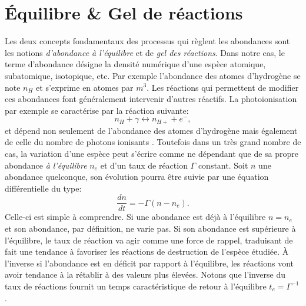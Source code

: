 \section{Équilibre \& Gel de réactions}
Les deux concepts fondamentaux des processus qui règlent les abondances sont les notions \textit{d'abondance à l'équilibre} et de \textit{gel des réactions}. Dans notre cas, le terme d'abondance désigne la densité numérique d'une espèce atomique, subatomique, isotopique, etc. Par exemple l'abondance des atomes d'hydrogène se note $n_H$ et s'exprime en atomes par $m^3$. Les réactions qui permettent de modifier ces abondances font généralement intervenir d'autres réactifs. La photoionisation par exemple se caractérise par la réaction suivante:
\begin{equation}
n_H+\gamma \leftrightarrow n_{H+} + e^-,
\end{equation}
et dépend non seulement de l'abondance des atomes d'hydrogène mais également de celle du nombre de photons ionisants . Toutefois dans un très grand nombre de cas, la variation d'une espèce peut s'écrire comme ne dépendant que de sa propre abondance \textit{à l'équilibre} $n_e$ et d'un taux de réaction $\Gamma$ constant. Soit $n$ une abondance quelconque, son évolution pourra être suivie par une équation différentielle du type:
\begin{equation}
\frac{dn}{dt}=-\Gamma (n-n_e).
\end{equation}
Celle-ci est simple à comprendre. Si une abondance est déjà à l'équilibre $n=n_e$ et son abondance, par définition, ne varie pas. Si son abondance est supérieure à l'équilibre, le taux de réaction va agir comme une force de rappel, traduisant de fait une tendance à favoriser les réactions de destruction de l'espèce étudiée. À l'inverse si l'abondance est en déficit par rapport à l'équilibre, les réactions vont avoir tendance à la rétablir à des valeurs plus élevées. Notons que  l'inverse du taux de réactions fournit un temps caractéristique de retour à l'équilibre $t_e=\Gamma^{-1}$.

